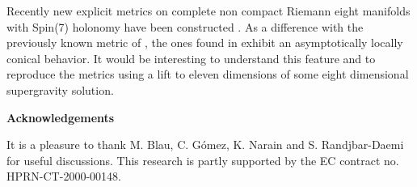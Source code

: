\documentclass[12pt,a4paper]{article}
\begin{document}
Recently new explicit metrics on complete non compact Riemann eight manifolds with Spin(7) 
holonomy have been constructed \cite{Cveticspin7}. As a difference with the previously 
known metric of \cite{BS,GPP}, the ones found in \cite{Cveticspin7} exhibit an asymptotically locally 
conical behavior. It would be interesting to understand this feature and to reproduce the metrics 
using a lift to eleven dimensions of some eight dimensional supergravity solution.





   
\vspace{8 mm}
  

{\bf Acknowledgements}

It is a pleasure to thank M. Blau, C. G\'omez, K. Narain and S. Randjbar-Daemi 
for useful discussions. This research is partly supported by the EC contract no. HPRN-CT-2000-00148.

\newpage


\end{document}

